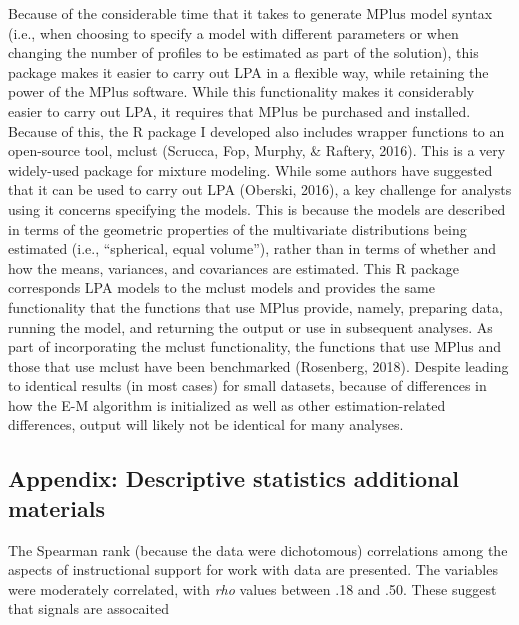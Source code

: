 \documentclass[]{book}
\theoremstyle{definition}
\theoremstyle{definition}
\theoremstyle{definition}
\theoremstyle{remark}
\begin{document}
Because of the considerable time that it takes to generate MPlus model
syntax (i.e., when choosing to specify a model with different parameters
or when changing the number of profiles to be estimated as part of the
solution), this package makes it easier to carry out LPA in a flexible
way, while retaining the power of the MPlus software. While this
functionality makes it considerably easier to carry out LPA, it requires
that MPlus be purchased and installed. Because of this, the R package I
developed also includes wrapper functions to an open-source tool, mclust
(Scrucca, Fop, Murphy, \& Raftery, 2016). This is a very widely-used
package for mixture modeling. While some authors have suggested that it
can be used to carry out LPA (Oberski, 2016), a key challenge for
analysts using it concerns specifying the models. This is because the
models are described in terms of the geometric properties of the
multivariate distributions being estimated (i.e., ``spherical, equal
volume''), rather than in terms of whether and how the means, variances,
and covariances are estimated. This R package corresponds LPA models to
the mclust models and provides the same functionality that the functions
that use MPlus provide, namely, preparing data, running the model, and
returning the output or use in subsequent analyses. As part of
incorporating the mclust functionality, the functions that use MPlus and
those that use mclust have been benchmarked (Rosenberg, 2018). Despite
leading to identical results (in most cases) for small datasets, because
of differences in how the E-M algorithm is initialized as well as other
estimation-related differences, output will likely not be identical for
many analyses.

\subsection{Appendix: Descriptive statistics additional
materials}\label{appendix-descriptive-statistics-additional-materials}

The Spearman rank (because the data were dichotomous) correlations among
the aspects of instructional support for work with data are presented.
The variables were moderately correlated, with \emph{rho} values between
.18 and .50. These suggest that signals are assocaited
\end{document}
